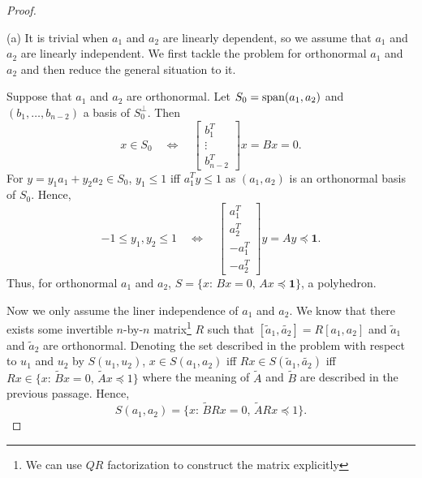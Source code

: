 \begin{proof}
  $\,$\par
  (a) It is trivial when $a_1$ and $a_2$ are linearly dependent, so we assume 
  that $a_1$ and $a_2$ are linearly independent. We first tackle the problem for
  orthonormal $a_1$ and $a_2$ and then reduce the general situation to it.\par
  Suppose that $a_1$ and $a_2$ are orthonormal. Let $S_0=\operatorname{span}(a_1,a_2)$ and 
  $(b_1,\dots,b_{n-2})$ a basis of $S_0^\perp$. Then
  \[
    x\in S_0 \quad\Leftrightarrow\quad
    \begin{bmatrix}
      b_1^T \\ \vdots \\ b_{n-2}^T 
    \end{bmatrix}x = Bx = 0.
  \]
  For $y=y_1a_1+y_2a_2\in S_0$, $y_1\le 1$ iff $a_1^Ty \le 1$ as $(a_1,a_2)$ is
  an orthonormal basis of $S_0$. Hence, 
  \[
    -1\le y_1,y_2\le 1 \quad\Leftrightarrow\quad
    \begin{bmatrix}
      a_1^T \\ a_2^T \\ -a_1^T \\ -a_2^T
    \end{bmatrix}y = Ay \preceq \mathbf{1}.
  \]
  Thus, for orthonormal $a_1$ and $a_2$, $S=\{x:\, Bx=0,\, Ax\preceq\mathbf{1}\}
  $, a polyhedron.\par
  Now we only assume the liner independence of $a_1$ and $a_2$. We know that
  there exists some invertible $n$-by-$n$ matrix\footnote{We can use $QR$ 
  factorization to construct the matrix explicitly} $R$ such that $[\tilde{a}_1,
  \tilde{a_2}]=R[a_1,a_2]$ and $\tilde{a}_1$ and $\tilde{a}_2$ are orthonormal. 
  Denoting the set described in the problem with respect to $u_1$ and $u_2$ by
  $S(u_1,u_2)$, $x\in S(a_1,a_2)$ iff $Rx\in S(\tilde{a}_1,\tilde{a_2})$ iff
  $Rx \in \{x:\,\tilde{B}x=0,\, \tilde{A}x\preceq 1\}$ where the meaning of 
  $\tilde{A}$ and $\tilde{B}$ are described in the previous passage. Hence, 
  \[
    S(a_1,a_2) = \{x:\, \tilde{B}Rx=0,\, \tilde{A}Rx\preceq 1\}.
  \]
  

\end{proof}
